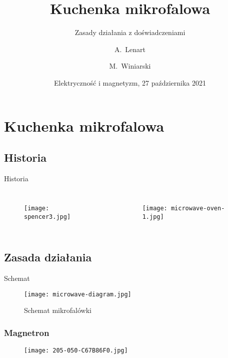\documentclass{beamer}
\title[Mikrofalówka] %
{Kuchenka mikrofalowa}
\subtitle{Zasady działania z doświadczeniami}
\author[Lenart, Winiarski] %
{A.~Lenart\inst{1} \and M.~Winiarski\inst{1}}
\institute[VFU] %
{
  \inst{1}%
  Wydział Fizyki, Astronomii i Informatyki Stosowanej\\
  Uniwersytet Jagielloński
}
\date[VLC 2014] %
{Elektryczność i magnetyzm, 27 października 2021}
\begin{document}
\frame{\titlepage}




\section{Kuchenka mikrofalowa}




\subsection{Historia}





\begin{frame}{Historia}

\begin{columns}

\begin{figure}
    \centering
    \texttt{[image: spencer3.jpg]}
    \label{pat}
\end{figure}\pause

    \begin{figure}
        \centering
        \texttt{[image: microwave-oven-1.jpg]}
        \label{rr}
    \end{figure}
    
    \end{columns}
\end{frame}

\subsection{Zasada działania}

\begin{frame}{Schemat}
    \begin{figure}
        \centering
        \texttt{[image: microwave-diagram.jpg]}
        \caption{Schemat mikrofalówki}
        \label{schemat}
    \end{figure}
\end{frame}


\begin{frame}
\frametitle{Magnetron}

\begin{figure}
    \texttt{[image: 205-050-C67B86F0.jpg]}
    \label{megatron}
\end{figure}

\end{frame}
\end{document}
